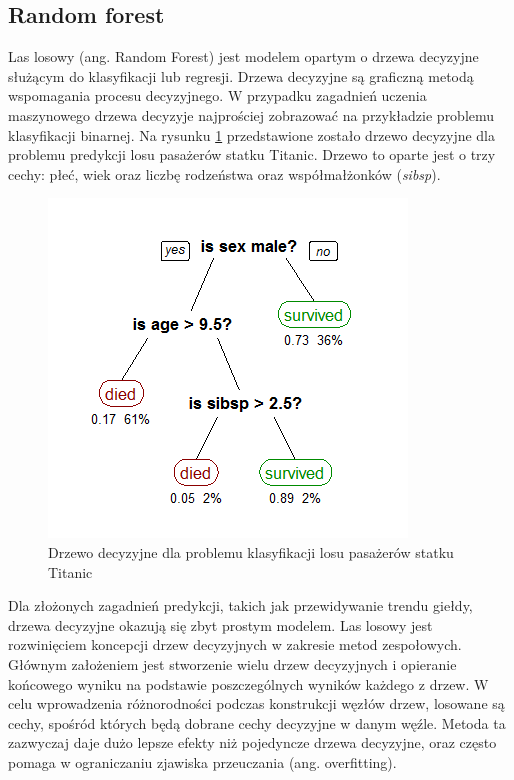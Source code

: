 \documentclass[a4paper, twoside, 11pt, openright]{article}
\begin{document}
\subsection{Random forest}

Las losowy (ang. Random Forest)\cite{randforest} jest modelem opartym o drzewa decyzyjne służącym do klasyfikacji lub regresji. Drzewa decyzyjne są graficzną metodą wspomagania procesu decyzyjnego. W przypadku zagadnień uczenia maszynowego drzewa decyzyje najprościej zobrazować na przykładzie problemu klasyfikacji binarnej. Na rysunku \ref{img:wiki_dec_tree} przedstawione zostało drzewo decyzyjne dla problemu predykcji losu pasażerów statku Titanic. Drzewo to oparte jest o trzy cechy: płeć, wiek oraz liczbę rodzeństwa oraz współmałżonków (\textit{sibsp}). 

\begin{figure}[H]
\centering \includegraphics[scale=0.6]{img/decision_tree.png}
\caption{Drzewo decyzyjne dla problemu klasyfikacji losu pasażerów statku Titanic \cite{wikidecisiontree}}
\label{img:wiki_dec_tree}
\end{figure}

Dla złożonych zagadnień predykcji, takich jak przewidywanie trendu giełdy, drzewa decyzyjne okazują się zbyt prostym modelem. Las losowy jest rozwinięciem koncepcji drzew decyzyjnych w zakresie metod zespołowych. Głównym założeniem jest stworzenie wielu drzew decyzyjnych i opieranie końcowego wyniku na podstawie poszczególnych wyników każdego z drzew. W celu wprowadzenia różnorodności podczas konstrukcji węzłów drzew, losowane są cechy, spośród których będą dobrane cechy decyzyjne w danym węźle. Metoda ta zazwyczaj daje dużo lepsze efekty niż pojedyncze drzewa decyzyjne, oraz często pomaga w ograniczaniu zjawiska przeuczania (ang. overfitting).  
\end{document}
